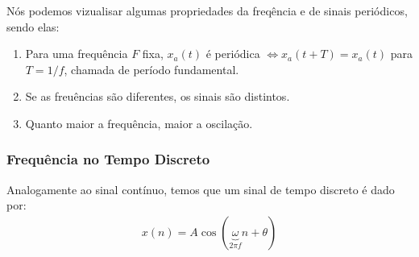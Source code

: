 \documentclass{article}
\begin{document}
Nós podemos vizualisar algumas propriedades da freqência e de sinais periódicos, sendo elas:

\begin{enumerate}
    \item Para uma frequência $F$ fixa, $x_a(t)$ é periódica $\iff x_a(t+T) = x_a(t)$ para $T=1/f$, chamada de período fundamental.
    \item Se as freuências são diferentes, os sinais são distintos.
    \item Quanto maior a frequência, maior a oscilação.
\end{enumerate}

\subsubsection{Frequência no Tempo Discreto}
\label{chap:freq_discreto}

Analogamente ao sinal contínuo, temos que um sinal de tempo discreto é dado por:
\begin{align*}
    x(n) = A\cos(\underbrace{\omega}_{2\pi f} n + \theta)
\end{align*}
\end{document}
